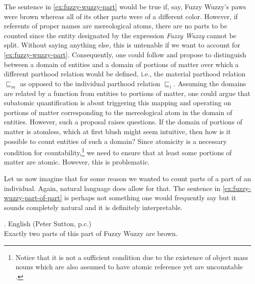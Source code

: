 	The sentence in \ref{ex:fuzzy-wuzzy-part} would be true if, say, Fuzzy Wuzzy's paws were brown where\-as all of its other parts were of a different color. However, if referents of proper names are mereological atoms, there are no parts to be counted since the entity designated by the expression \textit{Fuzzy Wuzzy} cannot be split. Without saying anything else, this is untenable if we want to account for \ref{ex:fuzzy-wuzzy-part}. Consequently, one could follow \citet{link1983logical} and propose to distinguish between a domain of entities and a domain of portions of matter over which a different parthood relation would be defined, i.e., the material parthood relation $\sqsubseteq_m$ as opposed to the individual parthood relation $\sqsubseteq_i$. Assuming the domains are related by a function from entities to portions of matter, one could argue that subatomic quantification is about triggering this mapping and operating on portions of matter corresponding to the mereological atom in the domain of entities. However, such a proposal raises questions. If the domain of portions of matter is atomless, which at first blush might seem intuitive, then how is it possible to count entities of such a domain? Since atomicity is a necessary condition for countability,\footnote{Notice that it is not a sufficient condition due to the existence of object mass nouns which are also assumed to have atomic reference yet are uncountable \citep[see, e.g.,][]{chierchia1998plurality,barner_snedeker2005quantity}.} we need to ensure that at least some portions of matter are atomic. However, this is problematic.\largerpage[-1]
	
	Let us now imagine that for some reason we wanted to count parts of a part of an individual. Again, natural language does allow for that. The sentence in \ref{ex:fuzzy-wuzzy-part-of-part} is perhaps not something one would frequently say but it sounds completely natural and it is definitely interpretable. 
	
		\ex. English (Peter Sutton, p.c.)\\
	Exactly two parts of this part of Fuzzy Wuzzy are brown.\label{ex:fuzzy-wuzzy-part-of-part}
	
